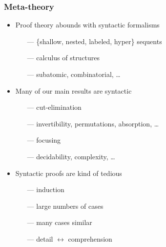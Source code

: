 \documentclass{beamer}
\begin{document}
\begin{frame}
  \frametitle{Meta-theory}

  \begin{itemize}[<+->]\itemsep 1em
  \item Proof theory abounds with syntactic formalisms
    \begin{itemize}[<.->]
    \item[---] \{shallow, nested, labeled, hyper\} sequents
    \item[---] calculus of structures
    \item[---] subatomic, combinatorial, \dots
    \end{itemize}
  \item Many of our main results are syntactic
    \begin{itemize}[<.->]
    \item[---] cut-elimination
    \item[---] invertibility, permutations, absorption, \dots
    \item[---] focusing
    \item[---] decidability, complexity, \dots
    \end{itemize}
  \item Syntactic proofs are kind of tedious
    \begin{itemize}[<.->]
    \item[---] induction
    \item[---] large numbers of cases
    \item[---] many cases similar
    \item[---] detail $\longleftrightarrow$ comprehension
    \end{itemize}
  \end{itemize}
\end{frame}
\end{document}
